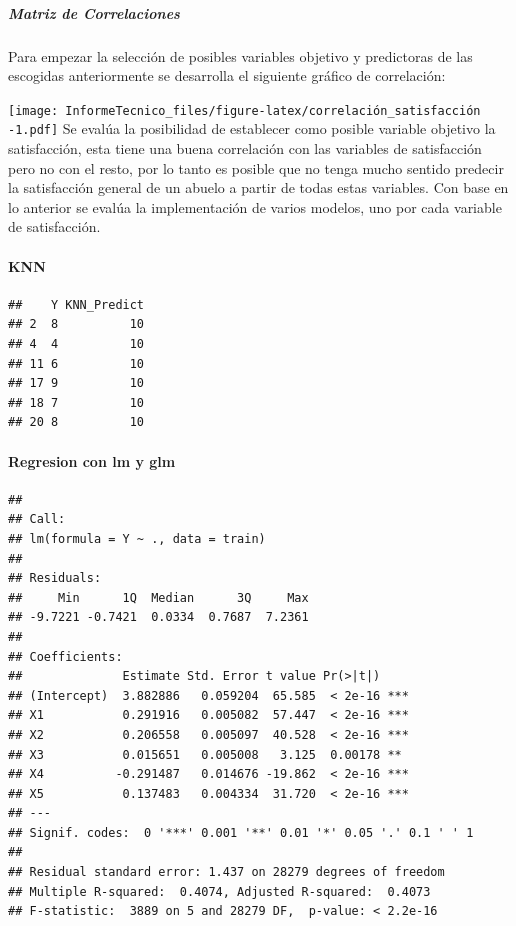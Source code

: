\documentclass[
]{article}
\begin{document}
\hypertarget{matriz-de-correlaciones}{%
\subparagraph{Matriz de Correlaciones}\label{matriz-de-correlaciones}}

Para empezar la selección de posibles variables objetivo y predictoras
de las escogidas anteriormente se desarrolla el siguiente gráfico de
correlación:

\texttt{[image: InformeTecnico\_files/figure-latex/correlación\_satisfacción -1.pdf]}
Se evalúa la posibilidad de establecer como posible variable objetivo la
satisfacción, esta tiene una buena correlación con las variables de
satisfacción pero no con el resto, por lo tanto es posible que no tenga
mucho sentido predecir la satisfacción general de un abuelo a partir de
todas estas variables. Con base en lo anterior se evalúa la
implementación de varios modelos, uno por cada variable de satisfacción.

\hypertarget{knn}{%
\paragraph{KNN}\label{knn}}

\begin{verbatim}
##    Y KNN_Predict
## 2  8          10
## 4  4          10
## 11 6          10
## 17 9          10
## 18 7          10
## 20 8          10
\end{verbatim}

\hypertarget{regresion-con-lm-y-glm}{%
\paragraph{Regresion con lm y glm}\label{regresion-con-lm-y-glm}}

\begin{verbatim}
## 
## Call:
## lm(formula = Y ~ ., data = train)
## 
## Residuals:
##     Min      1Q  Median      3Q     Max 
## -9.7221 -0.7421  0.0334  0.7687  7.2361 
## 
## Coefficients:
##              Estimate Std. Error t value Pr(>|t|)    
## (Intercept)  3.882886   0.059204  65.585  < 2e-16 ***
## X1           0.291916   0.005082  57.447  < 2e-16 ***
## X2           0.206558   0.005097  40.528  < 2e-16 ***
## X3           0.015651   0.005008   3.125  0.00178 ** 
## X4          -0.291487   0.014676 -19.862  < 2e-16 ***
## X5           0.137483   0.004334  31.720  < 2e-16 ***
## ---
## Signif. codes:  0 '***' 0.001 '**' 0.01 '*' 0.05 '.' 0.1 ' ' 1
## 
## Residual standard error: 1.437 on 28279 degrees of freedom
## Multiple R-squared:  0.4074, Adjusted R-squared:  0.4073 
## F-statistic:  3889 on 5 and 28279 DF,  p-value: < 2.2e-16
\end{verbatim}
\end{document}
